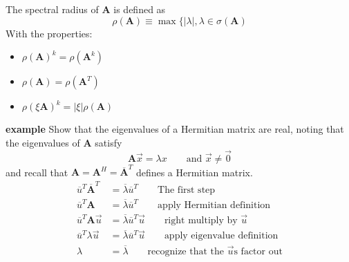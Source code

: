 \documentclass[12pt]{article}
\newcommand{\ve}[1]{\ensuremath{\mathbf{#1}}}
\newcommand{\cc}[1]{\ensuremath{\overline{#1}}}
\newcommand{\ccm}[1]{\ensuremath{\overline{\mathbf{#1}}}}
\begin{document}
The spectral radius of $\ve{A}$ is defined as 
\[\rho(\ve{A}) \equiv \max \lbrace |\lambda|, \lambda \in \sigma(\ve{A})\]
With the properties:
%
\begin{itemize}
\item $\rho(\ve{A})^k = \rho(\ve{A}^k)$
\item $\rho(\ve{A}) = \rho(\ve{A}^T)$
\item $\rho(\xi \ve{A})^k = |\xi| \rho(\ve{A})$
\end{itemize}



\textbf{example}
Show that the eigenvalues of a Hermitian matrix are real, noting that the eigenvalues of $\ve{A}$ satisfy
\[\ve{A}\vec{x} = \lambda x \qquad \text{and } \vec{x} \neq \vec{0}\]
and recall that $\ve{A} = \ve{A}^H = \ccm{A}^T$ defines a Hermitian matrix.
%
\begin{align}
\cc{u}^T \ccm{A}^T &= \cc{\lambda} \cc{u}^T
\qquad \text{The first step} \nonumber \\
%
\cc{u}^T \ve{A} &= \cc{\lambda} \cc{u}^T 
\qquad \text{apply Hermitian definition}\nonumber \\
%
\cc{u}^T \ve{A} \vec{u} &= \cc{\lambda} \cc{u}^T \vec{u}
\qquad \text{right multiply by }\vec{u}\nonumber \\
%
\cc{u}^T \lambda \vec{u} &= \cc{\lambda} \cc{u}^T \vec{u}
\qquad \text{apply eigenvalue definition }\nonumber \\
%
\lambda &= \cc{\lambda} 
\qquad \text{recognize that the }\vec{u}\text{s factor out}\nonumber
\end{align}
 
\end{document}
